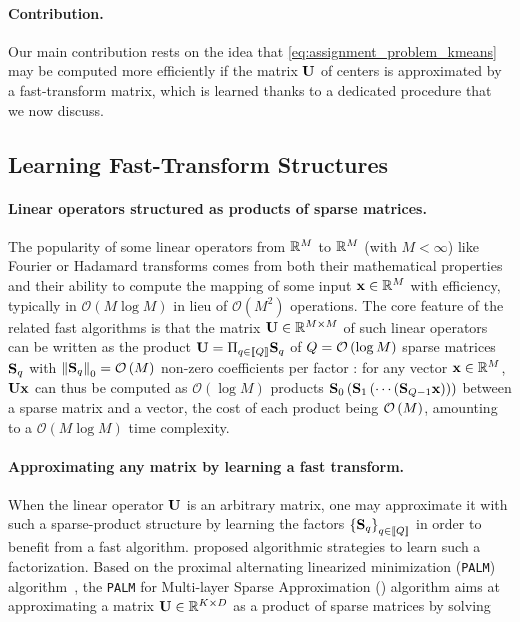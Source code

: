 
\paragraph{Contribution.} Our main contribution rests on the idea that \eqref{eq:assignment_problem_kmeans} may be computed more efficiently if the matrix ${\mathbf{U}}$ of centers is approximated by a fast-transform matrix, which is
learned thanks to a dedicated procedure that we now discuss.


\subsection{Learning Fast-Transform Structures}
\label{sec:palm4msa}

\paragraph{Linear operators structured as products of sparse matrices.}
The popularity of some linear operators from $\mathbb{R}^{M}$ to $\mathbb{R}^{M}$ (with $M<\infty$)
 like Fourier or Hadamard transforms comes from both their mathematical 
 properties and their ability to compute the mapping of some input ${\mathbf{x}}\in\mathbb{R}^M$ with efficiency, typically in $\mathcal{O}\left (M\log M\right )$ in lieu of  
  $\mathcal{O}\left (M^2\right)$ operations.
The core feature of the related fast algorithms is that the matrix ${\mathbf{U}}\in{\mathbb{R}}^{M\times M}$ of such 
linear operators can be written as the product ${\mathbf{U}}=\Pi_{q\in\left \llbracket Q\right \rrbracket}{\mathbf{S}}_q$ 
of $Q=\mathcal{O}\left(\log M\right)$ sparse 
matrices ${\mathbf{S}}_q$ with $\left \|{\mathbf{S}}_q\right \|_0=\mathcal{O}\left( M \right)$ non-zero 
coefficients per factor \cite{LeMagoarou2016Flexible,Morgenstern1975Linear}:
for any vector ${\mathbf{x}}\in{\mathbb{R}}^M$, ${\mathbf{U}}{\mathbf{x}}$ can thus be computed as $\mathcal{O}\left (\log M\right )$ products ${\mathbf{S}}_0 \left ({\mathbf{S}}_1 \left (\cdots \left ({\mathbf{S}}_{Q-1}{\mathbf{x}}\right )\right )\right )$ between a sparse matrix and a vector, the cost of each product being $\mathcal{O}\left(M\right)$, amounting to a $\mathcal{O}(M \log M)$ time complexity.

\paragraph{Approximating any matrix by learning a fast transform.} When the linear operator ${\mathbf{U}}$ is an arbitrary matrix, one may approximate it with such a sparse-product structure by learning the factors $\left \lbrace{\mathbf{S}}_q\right \rbrace_{q\in\left \llbracket Q\right \rrbracket}$ in order to benefit from a fast algorithm.
\citet{LeMagoarou2016Flexible} proposed algorithmic strategies to learn such a factorization. Based on the proximal alternating linearized minimization (\texttt{PALM}) algorithm~\cite{bolte2014proximal}, the \texttt{PALM} for Multi-layer Sparse Approximation (\palm) algorithm aims at approximating a matrix ${\mathbf{U}}\in{\mathbb{R}}^{K\times D}$ as a product of sparse matrices by solving

